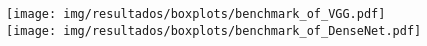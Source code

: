 \begin{figure}[h!]
	\texttt{[image: img/resultados/boxplots/benchmark\_of\_VGG.pdf]}
	\texttt{[image: img/resultados/boxplots/benchmark\_of\_DenseNet.pdf]}
	\caption{}
	\label{fig:Time_of_Extreme nets}
\end{figure}
